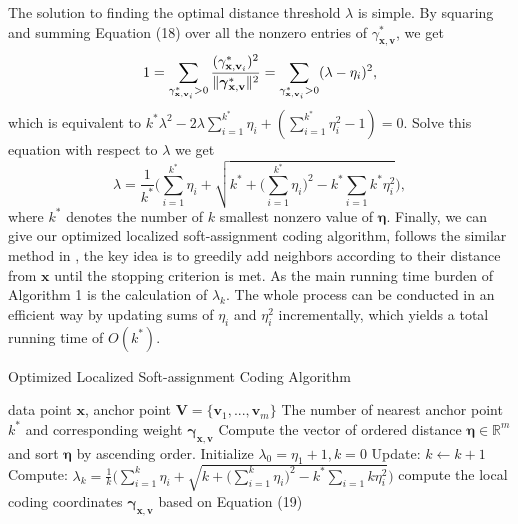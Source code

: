 \documentclass{llncs}
\DeclarePairedDelimiter\norm{\lVert}{\rVert}
\def \x {\mathbf{x}}
\def \v {\mathbf{v}}
\def \V {\mathbf{V}}
\begin{document}
	The solution to finding the optimal distance threshold $\lambda$ is simple. By squaring and summing Equation (18) over all the nonzero entries of $\gamma_{\x,\v}^*$, we get
	\begin{equation}
	1= \sum_{\gamma_{\x,\v_i}^*>0}\frac{(\gamma_{\x,\v_i}^*)^2}{\norm{\boldsymbol{\gamma}_{\x,\v}^*}^2}=\sum_{\gamma_{\x,\v_i}^*>0}(\lambda-\eta_i)^2,
	\end{equation}
	which is equivalent to $k^*\lambda^2-2\lambda\sum_{i=1}^{k^*}\eta_i+(\sum_{i=1}^{k^*}\eta_i^2-1)=0$. Solve this equation with respect to $\lambda$ we get
	\begin{equation}
	\lambda=\frac{1}{k^*}\Bigg(\sum_{i=1}^{k^*}\eta_i+\sqrt{k^*+\bigg(\sum_{i=1}^{k^*}\eta_i\bigg)^2-k^*\sum_{i=1}{k^*}\eta_i^2}\Bigg),
	\end{equation}
	where $k^*$ denotes the number of $k$ smallest nonzero value of $\boldsymbol{\eta}$. Finally, we can give our optimized localized soft-assignment coding algorithm, follows the similar method in \cite{6}, the key idea is to greedily add neighbors according to their distance from $\x$ until the stopping criterion is met. As the main running time burden of Algorithm 1 is the calculation of $\lambda_k$. The whole process can be conducted in an efficient way by updating sums of $\eta_i$ and $\eta_i^2$ incrementally, which yields a total running time of $O(k^*)$.
	\begin{algorithm}[H]
		\caption{Optimized Localized Soft-assignment Coding Algorithm}
		\begin{algorithmic}
			\REQUIRE data point $\x$, anchor point $\V=\{\v_1,...,\v_m\}$
			\ENSURE The number of nearest anchor point $k^*$ and corresponding weight $\boldsymbol{\gamma}_{\x,\v}$
			\STATE Compute the vector of ordered distance $\boldsymbol{\eta} \in \mathbb{R}^m$ and sort $\boldsymbol{\eta}$ by ascending order.
			\STATE Initialize $\lambda_0=\eta_1+1,k=0$
			\STATE Update: $k\leftarrow k+1$
			\STATE Compute: $\lambda_k=\frac{1}{k}\Bigg(\sum_{i=1}^{k}\eta_i+\sqrt{k+\bigg(\sum_{i=1}^{k}\eta_i\bigg)^2-k^*\sum_{i=1}{k}\eta_i^2}\Bigg)$
			\ENDWHILE
			\STATE compute the local coding coordinates $\boldsymbol{\gamma}_{\x,\v}$ based on Equation (19)
		\end{algorithmic}
	\end{algorithm}
\end{document}
